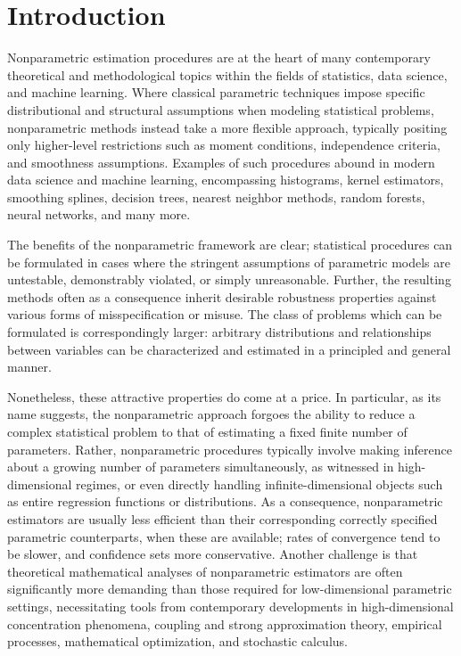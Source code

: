 
\chapter{Introduction}

Nonparametric estimation procedures are at the heart of many contemporary
theoretical and methodological topics within the fields of statistics, data
science, and machine learning. Where classical parametric techniques impose
specific distributional and structural assumptions when modeling statistical
problems, nonparametric methods instead take a more flexible approach,
typically positing only higher-level restrictions such as moment conditions,
independence criteria, and smoothness assumptions. Examples of such procedures
abound in modern data science and machine learning, encompassing histograms,
kernel estimators, smoothing splines, decision trees, nearest neighbor methods,
random forests, neural networks, and many more.

The benefits of the nonparametric framework are clear; statistical procedures
can be formulated in cases where the stringent assumptions of parametric models
are untestable, demonstrably violated, or simply unreasonable.
Further, the resulting
methods often as a consequence inherit desirable robustness properties against
various forms of misspecification or misuse. The class of problems which can be
formulated is correspondingly larger: arbitrary distributions and
relationships between variables can be characterized and estimated in a
principled and general manner.

Nonetheless, these attractive properties do come at a price. In particular, as
its name suggests, the nonparametric approach forgoes the ability to reduce
a complex statistical problem to that of estimating a fixed finite number of
parameters. Rather, nonparametric procedures typically involve making inference
about a growing number of parameters simultaneously, as witnessed in
high-dimensional regimes, or even directly handling infinite-dimensional
objects such as entire regression functions or distributions. As a consequence,
nonparametric estimators are usually less efficient than their corresponding
correctly specified parametric counterparts, when these are available; rates of
convergence tend to be slower, and confidence sets more conservative. Another
challenge is that theoretical mathematical analyses of nonparametric estimators
are often significantly more demanding than those required for low-dimensional
parametric settings, necessitating tools from contemporary developments in
high-dimensional concentration phenomena, coupling and strong approximation
theory, empirical processes, mathematical optimization, and stochastic
calculus.

